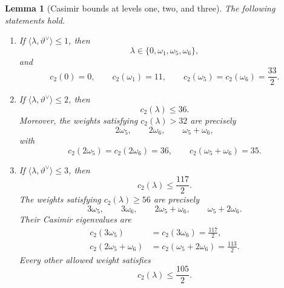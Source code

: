 \documentclass[11pt,reqno]{amsart}
\newtheorem{lemma}[theorem]{Lemma}
\theoremstyle{definition}
\theoremstyle{remark}
\begin{document}
\begin{lemma}[Casimir bounds at levels one, two, and three]
\label{e7:lem:E7-D6-Casimir-small-levels}
The following statements hold.
\begin{enumerate}
\item If \(\langle\lambda,\vartheta^\vee\rangle\le1\), then
\begin{equation*}
  \lambda\in\{0,\omega_1,\omega_5,\omega_6\},
\end{equation*}
and
\begin{equation*}
  c_2(0)=0,
  \qquad
  c_2(\omega_1)=11,
  \qquad
  c_2(\omega_5)=c_2(\omega_6)=\frac{33}{2}.
\end{equation*}

\item If \(\langle\lambda,\vartheta^\vee\rangle\le2\), then
\begin{equation*}
  c_2(\lambda)\le36.
\end{equation*}
Moreover, the weights satisfying \(c_2(\lambda)>32\) are precisely
\begin{equation*}
  2\omega_5,
  \qquad
  2\omega_6,
  \qquad
  \omega_5+\omega_6,
\end{equation*}
with
\begin{equation*}
  c_2(2\omega_5)=c_2(2\omega_6)=36,
  \qquad
  c_2(\omega_5+\omega_6)=35.
\end{equation*}

\item If \(\langle\lambda,\vartheta^\vee\rangle\le3\), then
\begin{equation*}
  c_2(\lambda)\le\frac{117}{2}.
\end{equation*}
The weights satisfying \(c_2(\lambda)\ge56\) are precisely
\begin{equation*}
  3\omega_5,
  \qquad
  3\omega_6,
  \qquad
  2\omega_5+\omega_6,
  \qquad
  \omega_5+2\omega_6.
\end{equation*}
Their Casimir eigenvalues are
\begin{align*}
  c_2(3\omega_5)
  &=c_2(3\omega_6)=\frac{117}{2},\\
  c_2(2\omega_5+\omega_6)
  &=c_2(\omega_5+2\omega_6)=\frac{113}{2}.
\end{align*}
Every other allowed weight satisfies
\begin{equation*}
  c_2(\lambda)\le\frac{105}{2}.
\end{equation*}
\end{enumerate}
\end{lemma}
\end{document}
